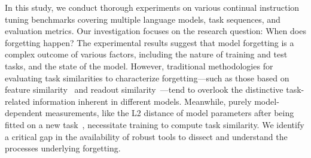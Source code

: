 In this study, we conduct thorough experiments on various continual instruction tuning benchmarks covering multiple language models, task sequences, and evaluation metrics. Our investigation focuses on the research question: When does forgetting happen? The experimental results suggest that model forgetting is a complex outcome of various factors, including the nature of training and test tasks, and the state of the model. However, traditional methodologies for evaluating task similarities to characterize forgetting—such as those based on feature similarity~\citep{ramasesh2020anatomy, lee2021continual} and readout similarity~\citep{lee2021continual}—tend to overlook the distinctive task-related information inherent in different models. Meanwhile, purely model-dependent measurements, like the L2 distance of model parameters after being fitted on a new task~\citep{lin2023theory, evron2024joint}, necessitate training to compute task similarity. We identify a critical gap in the availability of robust tools to dissect and understand the processes underlying forgetting.






